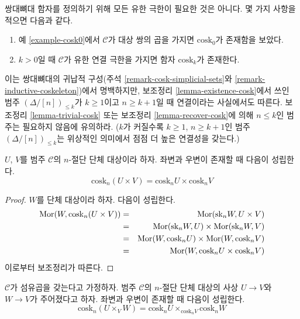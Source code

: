 \begin{remark}
\label{remark-existence-cosk}
쌍대뼈대 함자를 정의하기 위해 모든 유한 극한이 필요한 것은 아니다.
몇 가지 사항을 적으면 다음과 같다.
\begin{enumerate}
\item 예 \ref{example-cosk0}에서 $\mathcal{C}$가 대상 쌍의 곱을 가지면
$\text{cosk}_0$가 존재함을 보았다.
\item $k > 0$일 때 $\mathcal{C}$가 유한 연결 극한을 가지면
함자 $\text{cosk}_k$가 존재한다.
\end{enumerate}
이는 쌍대뼈대의 귀납적 구성(주석 \ref{remark-cosk-simplicial-sets}와
\ref{remark-inductive-coskeleton})에서 명백하지만, 보조정리
\ref{lemma-existence-cosk}에서 쓰인 범주
$(\Delta/[n])_{\leq k}$가 $k \geq 1$이고 $n \geq k + 1$일 때 연결이라는
사실에서도 따른다. 보조정리 \ref{lemma-trivial-cosk} 또는 보조정리
\ref{lemma-recover-cosk}에 의해 $n \leq k$인 범주는 필요하지 않음에
유의하라. ($k$가 커질수록 $k \geq 1$, $n \geq k + 1$인 범주
$(\Delta/[n])_{\leq k}$는 위상적인 의미에서 점점 더 높은 연결성을 갖는다.)
\end{remark}

\begin{lemma}
\label{lemma-cosk-product}
$U$, $V$를 범주 $\mathcal{C}$의 $n$-절단 단체 대상이라 하자. 좌변과
우변이 존재할 때 다음이 성립한다.
$$
\text{cosk}_n (U \times V) = \text{cosk}_nU \times \text{cosk}_nV
$$
\end{lemma}

\begin{proof}
$W$를 단체 대상이라 하자. 다음이 성립한다.
\begin{eqnarray*}
\mathop{\mathrm{Mor}}\nolimits(W, \text{cosk}_n (U \times V))
& = &
\mathop{\mathrm{Mor}}\nolimits(\text{sk}_n W, U \times V) \\
& = &
\mathop{\mathrm{Mor}}\nolimits(\text{sk}_n W, U)
\times
\mathop{\mathrm{Mor}}\nolimits(\text{sk}_nW, V) \\
& = &
\mathop{\mathrm{Mor}}\nolimits(W, \text{cosk}_n U)
\times
\mathop{\mathrm{Mor}}\nolimits(W, \text{cosk}_n V) \\
& = &
\mathop{\mathrm{Mor}}\nolimits(W, \text{cosk}_n U \times \text{cosk}_n V)
\end{eqnarray*}
이로부터 보조정리가 따른다.
\end{proof}

\begin{lemma}
\label{lemma-cosk-fibre-product}
$\mathcal{C}$가 섬유곱을 갖는다고 가정하자. 범주 $\mathcal{C}$의
$n$-절단 단체 대상의 사상 $U \to V$와 $W \to V$가 주어졌다고 하자.
좌변과 우변이 존재할 때 다음이 성립한다.
$$
\text{cosk}_n (U \times_V W)
=
\text{cosk}_nU \times_{\text{cosk}_n V} \text{cosk}_nW
$$
\end{lemma}

